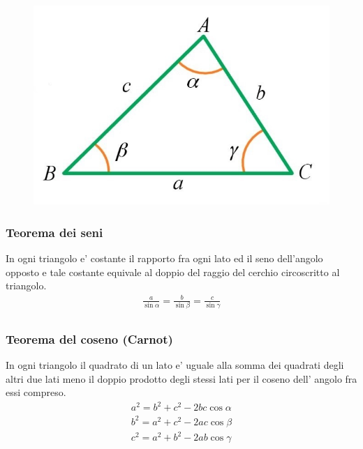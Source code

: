 \documentclass[a4paper]{article}
\begin{document}
	\begin{figure}[htbp]
		\begin{center}
			\includegraphics[width=\linewidth]{trigonometria.jpg}
		\end{center}
	\end{figure}



	\subsubsection{Teorema dei seni}
	In ogni triangolo e' costante il rapporto fra ogni lato ed il seno dell'angolo opposto e tale costante equivale al doppio del raggio del cerchio circoscritto al triangolo.
	\begin{align*}
	\frac{a}{\sin \alpha} = \frac{b}{\sin \beta} = \frac{c}{\sin \gamma}\\
	\end{align*}
	
	\subsubsection{Teorema del coseno (Carnot)}
	In ogni triangolo il quadrato di un lato e' uguale alla somma dei quadrati degli altri due lati meno il doppio prodotto degli stessi lati per il coseno dell' angolo fra essi compreso.\\
	\begin{align*}
		a^2 = b^2 + c^2 -2bc\cos \alpha\\
		b^2 = a^2 + c^2 -2ac\cos \beta\\
		c^2 = a^2 + b^2 -2ab\cos \gamma	
	\end{align*}
	
\end{document}
